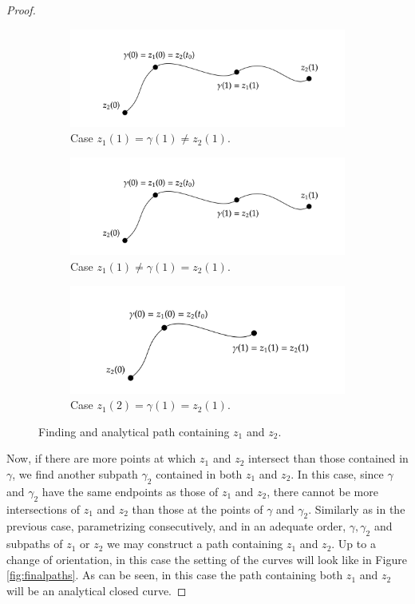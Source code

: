 \begin{proof}
\begin{figure}[!h]
\centering
\begin{subfigure}[h]{1\textwidth}
\includegraphics[width = .8\textwidth]{curv02} 
\caption{Case $z_1(1)=\gamma(1)\neq z_2(1)$.}
\label{fig:subim1}
\end{subfigure}
\begin{subfigure}[h]{1\textwidth}
\includegraphics[width =.8 \textwidth]{curv01}
\caption{Case $z_1(1)\neq \gamma(1)=z_2(1)$.}
\label{fig:subim2}
\end{subfigure}

\begin{subfigure}[h]{1\textwidth}
\includegraphics[width = .8\textwidth]{curve3}
\caption{Case $z_1(2)= \gamma(1)=z_2(1)$.}
\label{fig:subim3}
\end{subfigure}
\caption{Finding and analytical path containing $z_1$ and $z_2$.}
\label{fig:image2}
\end{figure}


 Now, if there are more points at which $z_1$ and $z_2$ intersect than those contained in $\gamma$, we find another subpath $\gamma_2$ contained in both $z_1$ and $z_2$. In this case, since $\gamma$ and $\gamma_2$ have the same endpoints as those of $z_1$ and $z_2$, there cannot be more intersections of $z_1$ and $z_2$ than those at the points of $\gamma$ and $\gamma_2$. Similarly as in the previous case, parametrizing consecutively, and in an adequate order, $\gamma,\gamma_2$ and subpaths of $z_1$ or $z_2$ we may construct a path containing $z_1$ and $z_2$. Up to a change of orientation, in this case the setting of the curves will look like in Figure \ref{fig:finalpaths}. As can be seen, in this case the path containing both $z_1$ and $z_2$ will be an analytical closed curve.
 

\end{proof}
